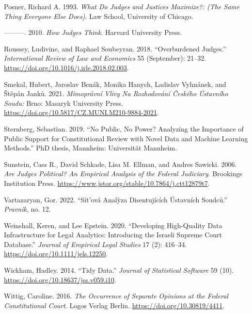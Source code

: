 \documentclass[
  11pt,
]{article}
\newlength{\cslhangindent}
\newenvironment{CSLReferences}[2] %
 {%
  \setlength{\parindent}{0pt}
  \ifodd #1 \everypar{\setlength{\hangindent}{\cslhangindent}}\ignorespaces\fi
  \ifnum #2 > 0
  \setlength{\parskip}{#2\baselineskip}
  \fi
 }%
 {}
\begin{document}
\begin{CSLReferences}{1}{0}
\leavevmode{}%
Posner, Richard A. 1993. \emph{What {Do Judges} and {Justices
Maximize}?: (The {Same Thing Everyone Else Does})}. {Law School,
University of Chicago}.

\leavevmode{}%
---------. 2010. \emph{How {Judges Think}}. {Harvard University Press}.

\leavevmode{}%
Roussey, Ludivine, and Raphael Soubeyran. 2018. {``Overburdened
Judges.''} \emph{International Review of Law and Economics} 55
(September): 21--32. \url{https://doi.org/10.1016/j.irle.2018.02.003}.

\leavevmode{}%
Smekal, Hubert, Jaroslav Benák, Monika Hanych, Ladislav Vyhnánek, and
Štěpán Janků. 2021. \emph{Mimopr{á}vn{í} Vlivy Na Rozhodov{á}n{í}
{Č}esk{é}ho {{Ú}stavn{í}ho} Soudu:} {Brno}: {Masaryk University Press}.
\url{https://doi.org/10.5817/CZ.MUNI.M210-9884-2021}.

\leavevmode{}%
Sternberg, Sebastian. 2019. {``No Public, No Power? {Analyzing} the
Importance of Public Support for Constitutional Review with Novel Data
and Machine Learning Methods.''} PhD thesis, {Mannheim}: Universit{ä}t
Mannheim.

\leavevmode{}%
Sunstein, Cass R., David Schkade, Lisa M. Ellman, and Andres Sawicki.
2006. \emph{Are {Judges Political}? {An Empirical Analysis} of the
{Federal Judiciary}}. {Brookings Institution Press}.
\url{https://www.jstor.org/stable/10.7864/j.ctt12879t7}.

\leavevmode{}%
Vartazaryan, Gor. 2022. {``S{í}t'ov{á} Anal{ỳ}za Disentuj{í}c{í}ch
{Ú}stavn{í}ch Soudc{ů}.''} \emph{Pravnik}, no. 12.

\leavevmode{}%
Weinshall, Keren, and Lee Epstein. 2020. {``Developing {High-Quality
Data Infrastructure} for {Legal Analytics}: {Introducing} the {Israeli
Supreme Court Database}.''} \emph{Journal of Empirical Legal Studies} 17
(2): 416--34. \url{https://doi.org/10.1111/jels.12250}.

\leavevmode{}%
Wickham, Hadley. 2014. {``Tidy {Data}.''} \emph{Journal of Statistical
Software} 59 (10). \url{https://doi.org/10.18637/jss.v059.i10}.

\leavevmode{}%
Wittig, Caroline. 2016. \emph{The {Occurrence} of {Separate Opinions} at
the {Federal Constitutional Court}}. {Logos Verlag Berlin}.
\url{https://doi.org/10.30819/4411}.

\end{CSLReferences}
\end{document}
